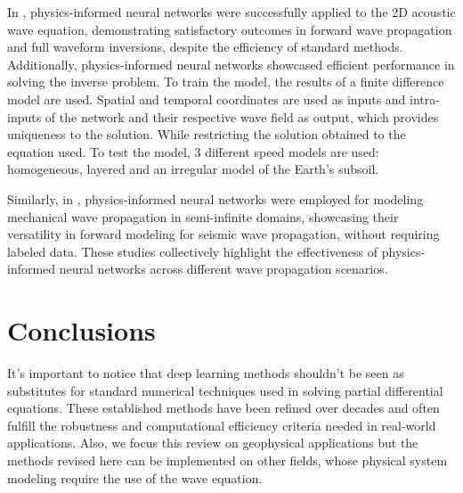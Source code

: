 \documentclass[11pt,twoside]{article}
\begin{document}
In , physics-informed neural networks were successfully applied to the 2D acoustic wave 
equation, demonstrating satisfactory outcomes in forward wave propagation and full waveform inversions, despite the efficiency of standard 
methods. Additionally, physics-informed neural networks showcased efficient performance in solving the inverse problem. To train the model, 
the results of a finite difference model are used. Spatial and temporal coordinates are used as inputs and intra-inputs of the network and 
their respective wave field as output, which provides uniqueness to the solution. While restricting the solution obtained to the equation 
used. To test the model, 3 different speed models are used: homogeneous, layered and an irregular model of the Earth's subsoil.

Similarly, in , physics-informed neural networks were employed for modeling mechanical wave propagation 
in semi-infinite domains, showcasing their versatility in forward modeling for seismic wave propagation, without requiring labeled data. 
These studies collectively highlight the effectiveness of physics-informed neural networks across different wave propagation scenarios.

\section{Conclusions}\label{sec:final_remarks_and_perspectives}


It's important to notice that deep learning methods shouldn't be seen as substitutes for standard numerical techniques used in solving 
partial differential equations. These established methods have been refined over decades and often fulfill the robustness and computational 
efficiency criteria needed in real-world applications. Also, we focus this review on geophysical applications but the methods revised here 
can be implemented on other fields, whose physical system modeling require the use of the wave equation. 


\end{document}
